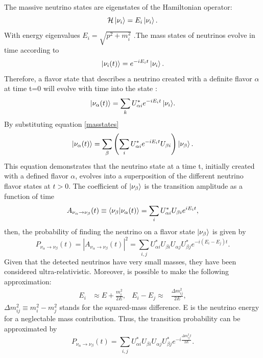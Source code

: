 The massive neutrino states are eigenstates of the Hamiltonian operator:
\begin{equation}
    \mathcal{H}\ket{\nu_i}=E_i\ket{\nu_i}.
\end{equation}
With energy eigenvalues $E_i=\sqrt{p^2+m_i^2}$  .The mass states of neutrinos evolve in time according to 
\begin{equation}
    \ket{\nu_i (t)} =e^{-iE_i t}\ket{\nu_i}.
\end{equation}
Therefore, a flavor state that describes a neutrino created with a definite flavor $\alpha$ at time t=0 will evolve with time into the state :
\begin{equation}
    \ket{\nu_\alpha(t)}=\sum_k{U^*_{\alpha i}e^{-iE_it}\ket{\nu_i}}.
\end{equation}
By substituting equation \ref{masstates}
\begin{equation*}
    \ket{\nu_\alpha(t)}=\sum_\beta \left( \sum_i U^*_{\alpha i}e^{-iE_i t}U_{\beta i} \right) \ket{\nu_\beta}.
\end{equation*}
This equation demonstrates that the neutrino state at a time t, initially created with a defined flavor $\alpha$, evolves into a superposition of the different neutrino flavor states at $t>0$. The coefficient of $\ket{\nu_\beta}$ is the transition amplitude as a function of time
\begin{equation*}
    A_{\nu_\alpha \rightarrow \nu_\beta} (t) \equiv \braket{\nu_\beta|\nu_\alpha(t)} =\sum_i U^*_{\alpha i} U_{\beta i} e^{iE_i t},
\end{equation*}
then, the probability of finding the neutrino on a  flavor state $\ket{\nu_\beta}$ is given by
\begin{equation}
    P_{\nu_\alpha\rightarrow\nu_\beta}(t)=|A_{\nu_\alpha \rightarrow \nu_\beta} (t)|^2 =\sum_{i,j} U^*_{\alpha i} U_{\beta i} U_{\alpha j} U^*_{\beta j} e^{-i(E_i -E_j) t}.
\end{equation}
Given that the detected neutrinos have very small masses, they have been considered ultra-relativistic. Moreover, is possible to  make the following approximation:
\begin{align}
    E_i&\approx E +\frac{m_i^2}{2E}, & E_i-E_j\approx& \frac{\Delta m^2_{ij}}{2E},
\end{align}
$\Delta m^2_{ij}\equiv m_i^2-m_j^2$ stands for the squared-mass difference. E is the neutrino energy for a neglectable mass contribution.  Thus, the transition probability can be approximated by
\begin{equation*}
    P_{\nu_\alpha\rightarrow\nu_\beta}(t)=\sum_{i,j} U^*_{\alpha i} U_{\beta i} U_{\alpha j} U^*_{\beta j} e^{-i\frac{\Delta m^2_{ij}t}{2E}}.
\end{equation*}
